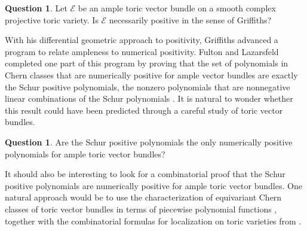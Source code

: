 \documentclass[12pt]{amsart}
\theoremstyle{definition}
\newtheorem{question}[lemma]{Question}
\theoremstyle{remark}
\begin{document}
\begin{question} \label{q7}
Let ${\mathcal{E}}$ be an ample toric vector bundle on a smooth complex projective toric variety.  Is ${\mathcal{E}}$ necessarily positive in the sense of Griffiths?
\end{question}

\bigskip

With his differential geometric approach to positivity, Griffiths advanced a program to relate ampleness to numerical positivity.  Fulton and Lazarsfeld completed one part of this program by proving that the set of polynomials in Chern classes that are numerically positive for ample vector bundles are exactly the Schur positive polynomials, the nonzero polynomials that are nonnegative linear combinations of the Schur polynomials \cite{FultonLazarsfeld}.  It is natural to wonder whether this result could have been predicted through a careful study of toric vector bundles.

\begin{question} \label{q8}
Are the Schur positive polynomials the only numerically positive polynomials for ample toric vector bundles?
\end{question}

\noindent It should also be interesting to look for a combinatorial proof that the Schur positive polynomials are numerically positive for ample toric vector bundles.  One natural approach would be to use the characterization of equivariant Chern classes of toric vector bundles in terms of piecewise polynomial functions \cite[Theorem~3]{chow}, together with the combinatorial formulas for localization on toric varieties from \cite{localization}.
\end{document}
